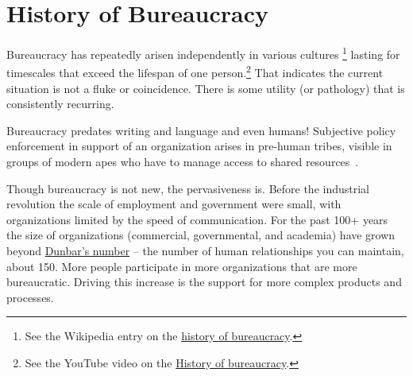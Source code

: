\section{History of Bureaucracy\label{sec:history}}


Bureaucracy has repeatedly arisen independently in various cultures
\footnote{See the Wikipedia entry on the \href{https://en.wikipedia.org/wiki/Bureaucracy\%23History}{history of bureaucracy}.
}
lasting for timescales that exceed the lifespan of one person.\footnote{See the YouTube video on the \href{https://www.youtube.com/watch?v=B_nsZlcC12g}{History of bureaucracy}.} That indicates the current situation is not a fluke or coincidence. There is some utility (or pathology) that is consistently recurring. 


Bureaucracy predates writing and language and even humans! Subjective policy enforcement in support of an organization arises in pre-human tribes, visible in groups of modern apes who have to manage access to shared resources~\cite{2016_Suchak}. 



Though bureaucracy is not new, the pervasiveness is. Before the industrial revolution the scale of employment and government were small, with organizations limited by the speed of communication. For the past 100+ years the size of organizations (commercial, governmental, and academia) have grown beyond \href{https://en.wikipedia.org/wiki/Dunbar\%27s_number}{Dunbar's number} -- the number of human relationships you can maintain, about 150. \iftoggle{WPinmargin}{\marginpar{[Wikipedia] Dunbar's\\number}}{}
More people participate in more organizations that are more bureaucratic. Driving this increase is the support for more complex products and processes. 



